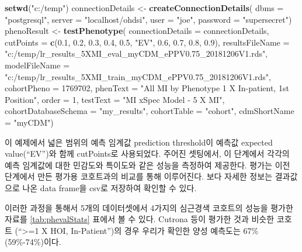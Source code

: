 \documentclass[10.5pt]{book}
\newenvironment{Shaded}{\begin{snugshade}}{\end{snugshade}}
\newcommand{\KeywordTok}[1]{\textcolor[rgb]{0.13,0.29,0.53}{\textbf{#1}}}
\newcommand{\DataTypeTok}[1]{\textcolor[rgb]{0.13,0.29,0.53}{#1}}
\newcommand{\DecValTok}[1]{\textcolor[rgb]{0.00,0.00,0.81}{#1}}
\newcommand{\FloatTok}[1]{\textcolor[rgb]{0.00,0.00,0.81}{#1}}
\newcommand{\StringTok}[1]{\textcolor[rgb]{0.31,0.60,0.02}{#1}}
\newcommand{\NormalTok}[1]{#1}
\theoremstyle{definition}
\theoremstyle{definition}
\theoremstyle{definition}
\theoremstyle{remark}
\begin{document}
\begin{Shaded}
\begin{Highlighting}[]
\KeywordTok{setwd}\NormalTok{(}\StringTok{"c:/temp"}\NormalTok{)}
\NormalTok{connectionDetails <-}\StringTok{ }\KeywordTok{createConnectionDetails}\NormalTok{(}
  \DataTypeTok{dbms =} \StringTok{"postgresql"}\NormalTok{,}
  \DataTypeTok{server =} \StringTok{"localhost/ohdsi"}\NormalTok{,}
  \DataTypeTok{user =} \StringTok{"joe"}\NormalTok{,}
  \DataTypeTok{password =} \StringTok{"supersecret"}\NormalTok{)}
\NormalTok{phenoResult <-}\StringTok{ }\KeywordTok{testPhenotype}\NormalTok{(}
  \DataTypeTok{connectionDetails =}\NormalTok{ connectionDetails,}
  \DataTypeTok{cutPoints =} \KeywordTok{c}\NormalTok{(}\FloatTok{0.1}\NormalTok{, }\FloatTok{0.2}\NormalTok{, }\FloatTok{0.3}\NormalTok{, }\FloatTok{0.4}\NormalTok{, }\FloatTok{0.5}\NormalTok{, }\StringTok{"EV"}\NormalTok{, }\FloatTok{0.6}\NormalTok{, }\FloatTok{0.7}\NormalTok{, }\FloatTok{0.8}\NormalTok{, }\FloatTok{0.9}\NormalTok{),}
  \DataTypeTok{resultsFileName =}
    \StringTok{"c:/temp/lr_results_5XMI_eval_myCDM_ePPV0.75_20181206V1.rds"}\NormalTok{,}
  \DataTypeTok{modelFileName =}
    \StringTok{"c:/temp/lr_results_5XMI_train_myCDM_ePPV0.75_20181206V1.rds"}\NormalTok{,}
  \DataTypeTok{cohortPheno =} \DecValTok{1769702}\NormalTok{,}
  \DataTypeTok{phenText =} \StringTok{"All MI by Phenotype 1 X In-patient, 1st Position"}\NormalTok{,}
  \DataTypeTok{order =} \DecValTok{1}\NormalTok{,}
  \DataTypeTok{testText =} \StringTok{"MI xSpec Model - 5 X MI"}\NormalTok{,}
  \DataTypeTok{cohortDatabaseSchema =} \StringTok{"my_results"}\NormalTok{,}
  \DataTypeTok{cohortTable =} \StringTok{"cohort"}\NormalTok{,}
  \DataTypeTok{cdmShortName =} \StringTok{"myCDM"}\NormalTok{)}
\end{Highlighting}
\end{Shaded}

이 예제에서 넓은 범위의 예측 임계값 prediction threshold이 예측값
expected value(``EV'')와 함께 cutPoints로 사용되었다. 주어진 셋팅에서,
이 단계에서 각각의 예측 임계값에 대한 민감도와 특이도와 같은 성능을
측정하여 제공한다. 평가는 이전 단계에서 만든 평가용 코호트과의 비교를
통해 이루어진다. 보다 자세한 정보는 결과값으로 나온 data frame을 csv로
저장하여 확인할 수 있다.

이러한 과정을 통해서 5개의 데이터셋에서 4가지의 심근경색 코호트의 성능을
평가한 자료를 \ref{tab:phevalStats} 표에서 볼 수 있다. Cutrona 등이
평가한 것과 비슷한 코호트 (``\textgreater{}=1 X HOI, In-Patient'')의
경우 우리가 확인한 양성 예측도는 67\% (59\%-74\%)이다.
\end{document}
